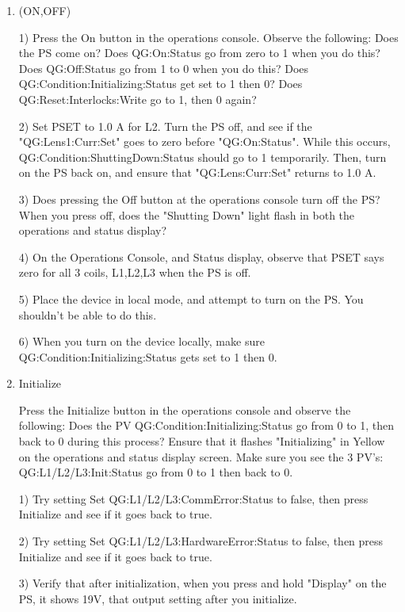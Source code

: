 \documentclass[11pt]{book}		%
\begin{document}
\begin{enumerate}
 
\item (ON,OFF) 

\color{red}
1) Press the On button in the operations console. Observe the following: 
	Does the PS come on? 
	Does QG:On:Status go from zero to 1 when you do this? 
	Does QG:Off:Status go from 1 to 0 when you do this? 
	Does QG:Condition:Initializing:Status get set to 1 then 0?
	Does QG:Reset:Interlocks:Write go to 1, then 0 again?

2) Set PSET to 1.0 A for L2. Turn the PS off, and see if the "QG:Lens1:Curr:Set" goes to zero before "QG:On:Status". While this occurs, QG:Condition:ShuttingDown:Status should go to 1 temporarily. Then, turn on the PS back on, and ensure that "QG:Lens:Curr:Set" returns to 1.0 A.

3) Does pressing the Off button at the operations console turn off the PS? When you press off, does the "Shutting Down" light flash in both the operations and status display?

4) On the Operations Console, and Status display, observe that PSET says zero for all 3 coils, L1,L2,L3 when the PS is off.

5) Place the device in local mode, and attempt to turn on the PS. You shouldn't be able to do this.

6) When you turn on the device locally, make sure QG:Condition:Initializing:Status gets set to 1 then 0.


\color{black}

 \item Initialize

\color{red}

Press the Initialize button in the operations console and observe the following: 
	Does the PV QG:Condition:Initializing:Status go from 0 to 1, then back to 0 during this process? 
	Ensure that it flashes "Initializing" in Yellow on the operations and status display screen. 
	Make sure you see the 3 PV's: QG:L1/L2/L3:Init:Status go from 0 to 1 then back to 0.

1) Try setting Set QG:L1/L2/L3:CommError:Status to false, then press Initialize and see if it goes back to true.

2) Try setting Set QG:L1/L2/L3:HardwareError:Status to false, then press Initialize and see if it goes back to true.

3) Verify that after initialization, when you press and hold "Display" on the PS, it shows 19V, that output setting after you initialize.


\end{enumerate}
\end{document}
